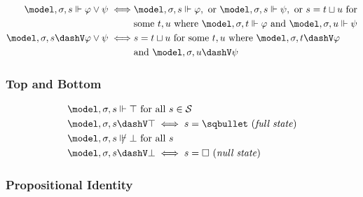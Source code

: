 \documentclass[../LogosReference.tex]{subfiles}
\begin{document}
\begin{definition}\label{def:disjunction-verification}
	\begin{align}
		\model, \assignment, s \verifies \metaA \lor \metaB \iff
		 & \model, \assignment, s \verifies \metaA, \text{ or } \model, \assignment, s \verifies \metaB, \text{ or } s = \fusion{t}{u} \text{ for} \notag \\
		 & \text{some } t, u \text{ where } \model, \assignment, t \verifies \metaA \text{ and } \model, \assignment, u \verifies \metaB                  \\
		\model, \assignment, s \falsifies \metaA \lor \metaB \iff
		 & s = \fusion{t}{u} \text{ for some } t, u \text{ where } \model, \assignment, t \falsifies \metaA \notag                                        \\
		 & \text{and } \model, \assignment, u \falsifies \metaB
	\end{align}
\end{definition}

\subsubsection{Top and Bottom}\label{sec:top-bottom}

\begin{definition}\label{def:top-bottom-verification}
	\begin{align}
		 & \model, \assignment, s \verifies \top \text{ for all } s \in \statespace                 \\
		 & \model, \assignment, s \falsifies \top \iff s = \fullstate \text{ (\textit{full state})} \\
		 & \model, \assignment, s \nverifies \bot \text{ for all } s                                \\
		 & \model, \assignment, s \falsifies \bot \iff s = \nullstate \text{ (\textit{null state})}
	\end{align}
\end{definition}

\subsubsection{Propositional Identity}\label{sec:propositional-identity}
\end{document}
